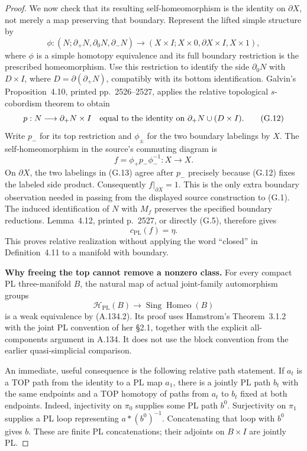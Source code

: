 \begin{proof}
We now check that its resulting self-homeomorphism is the identity on
$\partial X$, not merely a map preserving that boundary. Represent
the lifted simple structure by
\[
 \phi:(N;\partial_+N,\partial_0N,\partial_-N)
   \longrightarrow(X\times I;X\times0,\partial X\times I,X\times1),
                                                        \tag{G.11}
\]
where $\phi$ is a simple homotopy equivalence and its full boundary
restriction is the prescribed homeomorphism. Use this restriction to
identify the side $\partial_0N$ with $D\times I$, where
$D=\partial(\partial_+N)$, compatibly with its bottom identification.
Galvin's Proposition~4.10, printed pp.~2526--2527, applies the relative
topological $s$-cobordism theorem to obtain
\[
 p:N\longrightarrow\partial_+N\times I
 \quad\hbox{equal to the identity on }
       \partial_+N\cup(D\times I).
                                                        \tag{G.12}
\]
Write $p_-$ for its top restriction and $\phi_\pm$ for the two boundary
labelings by $X$. The self-homeomorphism in the source's commuting
diagram is
\[
                  f=\phi_+p_-\phi_-^{-1}:X\longrightarrow X.
                                                        \tag{G.13}
\]
On $\partial X$, the two labelings in (G.13) agree after $p_-$ precisely
because (G.12) fixes the labeled side product. Consequently
$f|_{\partial X}=1$. This is the only extra boundary observation needed
in passing from the displayed source construction to (G.1).
The induced identification of $N$ with $M_f$ preserves the specified
boundary reductions. Lemma~4.12, printed p.~2527, or directly (G.5),
therefore gives
\[
                   c_{\mathrm{PL}}(f)=\eta.
                                                        \tag{G.14}
\]
This proves relative realization without applying the word ``closed''
in Definition~4.11 to a manifold with boundary.

\textbf{Why freeing the top cannot remove a nonzero class.}
For every compact PL three-manifold $B$, the natural map of actual
joint-family automorphism groups
\[
 \mathcal H_{\mathrm{PL}}(B)\longrightarrow
 \operatorname{Sing}\operatorname{Homeo}(B)
                                                        \tag{G.15}
\]
is a weak equivalence by (A.134.2). Its proof uses Hamstrom's
Theorem~3.1.2 with the joint PL convention of her \S2.1, together with
the explicit all-components argument in A.134. It does not use the
block convention from the earlier quasi-simplicial comparison.

An immediate, useful consequence is the following relative path
statement. If $a_t$ is a TOP path from the identity to a PL map $a_1$,
there is a jointly PL path $b_t$ with the same endpoints and a TOP
homotopy of paths from $a_t$ to $b_t$ fixed at both endpoints. Indeed,
injectivity on $\pi_0$ supplies some PL path $b^0$. Surjectivity on
$\pi_1$ supplies a PL loop representing $a*(b^0)^{-1}$. Concatenating
that loop with $b^0$ gives $b$. These are finite PL concatenations;
their adjoints on $B\times I$ are jointly PL.


\end{proof}
